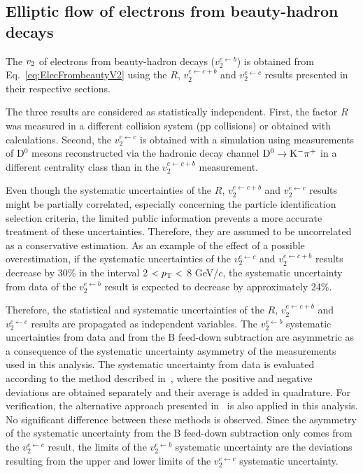 \documentclass[11pt,a4paper]{article}
\providecommand{\vtwo}{$v_{\rm 2}$ }
\begin{document}
\subsection{Elliptic flow of electrons from beauty-hadron decays}
\label{Sec:ElectronFromBeautyV2}

The \vtwo of electrons from beauty-hadron decays ($v_{2}^{e \leftarrow b}$) is  obtained from Eq.~\ref{eq:ElecFrombeautyV2} using the  $R$,  $v_{2}^{e \leftarrow c+b}$ and $v_{2}^{e \leftarrow c}$ results presented in their respective sections.


The three results are considered as statistically independent. First, the factor $R$ was measured in a different collision system (pp collisions) or obtained with calculations. Second, the $v_{2}^{e \leftarrow c}$ is obtained with a simulation using measurements of D$^{0}$ mesons reconstructed via the hadronic decay channel $\rm{D}^{0} \rightarrow \rm{K}^{-} \pi^{+}$ in a different centrality class than in the $v_{2}^{e \leftarrow c+b}$  measurement. 

Even though the systematic uncertainties of the $R$,  $v_{2}^{e \leftarrow c+b}$ and $v_{2}^{e \leftarrow c}$ results might be partially correlated, especially concerning the particle identification selection criteria, the limited public information prevents  a more accurate treatment of these uncertainties. Therefore, they are assumed to be uncorrelated as a conservative estimation. As an example of the effect of a possible overestimation, if the systematic uncertainties of the $v_{2}^{e \leftarrow c}$ and $v_{2}^{e \leftarrow c+b}$ results decrease by 30\% in the interval 2 $< p_{\rm T} <$ 8 GeV/$c$, the systematic uncertainty  from data of the $v_{2}^{e \leftarrow b}$ result is expected to decrease by approximately 24\%.

Therefore, the statistical and systematic uncertainties of the $R$,  $v_{2}^{e \leftarrow c+b}$ and $v_{2}^{e \leftarrow c}$ results are propagated as independent variables. 
The $v_{2}^{e \leftarrow b}$ systematic uncertainties from data and from the B feed-down subtraction are asymmetric as a consequence of the systematic uncertainty asymmetry of the measurements used in this analysis. 
The systematic uncertainty from data is evaluated according to the method described in~\cite{DAgostini:2004yu}, where the positive and negative deviations are obtained separately and their average is added in quadrature. For verification, the alternative approach presented in~\cite{Barlow:2003sg} is also applied in this analysis. No significant difference between these methods is observed. Since the asymmetry of the  systematic  uncertainty from the B feed-down subtraction only comes  from the $v_{2}^{e \leftarrow c}$ result, the limits of the $v_{2}^{e \leftarrow b}$ systematic uncertainty are the deviations  resulting from the upper and lower limits of the $v_{2}^{e \leftarrow c}$ systematic uncertainty. 
\end{document}

